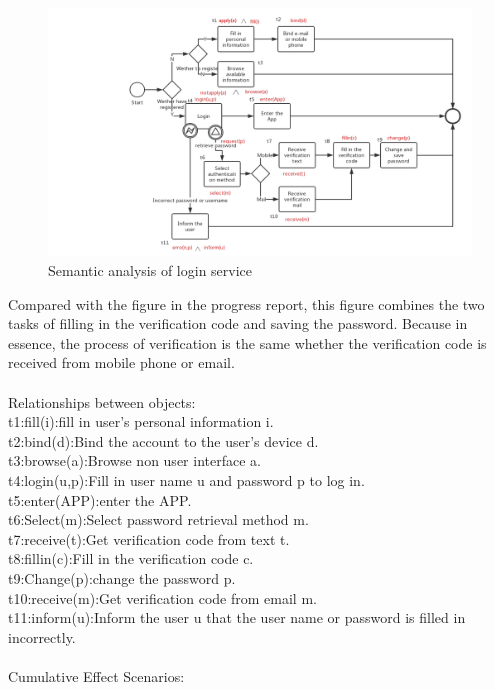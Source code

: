\documentclass[runningheads]{llncs}
\begin{document}
\begin{figure}[H]
		\centering %
		\includegraphics[width=1.0\textwidth]{./figure/Hyy/login} %
		\caption{Semantic analysis of login service} %
		\label{login} %
	\end{figure}
Compared with the figure in the progress report, this figure combines the two tasks of filling in the verification code and saving the password. Because in essence, the process of verification is the same whether the verification code is received from mobile phone or email.\\
\\
Relationships between objects:\\
t1:fill(i):fill in user’s personal information i.\\
t2:bind(d):Bind the account to the user's device d.\\
t3:browse(a):Browse non user interface a.\\
t4:login(u,p):Fill in user name u and password p to log in.\\
t5:enter(APP):enter the APP.\\
t6:Select(m):Select password retrieval method m.\\
t7:receive(t):Get verification code from text t.\\
t8:fillin(c):Fill in the verification code c.\\
t9:Change(p):change the password p.\\
t10:receive(m):Get verification code from email m.\\
t11:inform(u):Inform the user u that the user name or password is filled in incorrectly.\\
\\
Cumulative Effect Scenarios:\\
\end{document}
